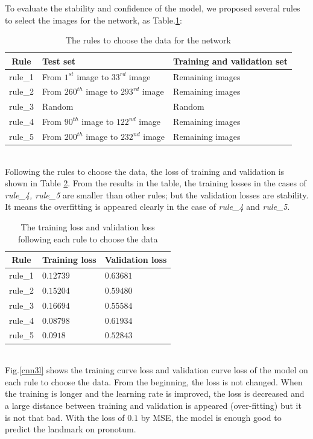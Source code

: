 \documentclass[12pt,a4paper]{article}
\begin{document}
To evaluate the stability and confidence of the model, we proposed several rules to select the images for the network, as Table.\ref{choosedata}:\\
\begin{table}[h!]
	\centering
	\begin{tabular}{c l l}
	Rule & Test set & Training and validation set \\ \hline
	rule\_1 & From $1^{st}$ image to $33^{rd}$ image & Remaining images \\ \hline
	rule\_2 & From $260^{th}$ image to $293^{rd}$ image & Remaining images\\ \hline
	rule\_3 & Random & Random \\ \hline
	rule\_4 & From $90^{th}$ image to $122^{nd}$ image & Remaining images\\ \hline
	rule\_5 & From $200^{th}$ image to $232^{nd}$ image & Remaining images \\ \hline
	\end{tabular}
	\caption{The rules to choose the data for the network}
	\label{choosedata}
\end{table}~\\
Following the rules to choose the data, the loss of training and validation is shown in Table \ref{losschoosedata}. From the results in the table, the training losses in the cases of \textit{rule\_4, rule\_5} are smaller than other rules; but the validation losses are stability. It means the overfitting is appeared clearly in the case of \textit{rule\_4} and \textit{rule\_5}.
\begin{table}[h!]
	\centering
	\begin{tabular}{c l l}
	Rule & Training loss & Validation loss \\ \hline
	rule\_1 & $0.12739$ & $0.63681$ \\ \hline
	rule\_2 & $0.15204$ & $0.59480$ \\ \hline
	rule\_3 & $0.16694$ & $0.55584$ \\ \hline
	rule\_4 & $0.08798$ & $0.61934$ \\ \hline
	rule\_5 & $0.0918$ & $0.52843$ \\ \hline
	\end{tabular}
	\caption{The training loss and validation loss following each rule to choose the data}
	\label{losschoosedata}
\end{table}~\\[0.1cm]
Fig.\ref{cnn3l} shows the training curve loss and validation curve loss of the model on each rule to choose the data. From the beginning, the loss is not changed. When the training is longer and the learning rate is improved, the loss is decreased and a large distance between training and validation is appeared (over-fitting) but it is not that bad. With the loss of $0.1$ by MSE, the model is enough good to predict the landmark on pronotum.
\end{document}
